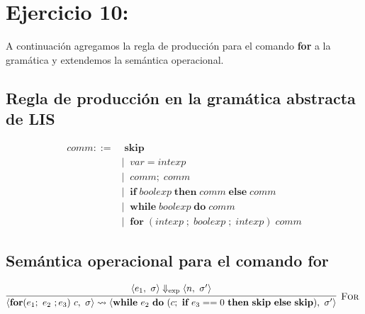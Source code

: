 \documentclass[11pt, fleqn]{article}
\begin{document}

\section*{Ejercicio 10:}

A continuación agregamos la regla de producción para el comando \textbf{for} a la
gramática y extendemos la semántica operacional.

\subsection*{Regla de producción en la gramática abstracta de LIS}

\begin{align*}
comm ::=& \; \textbf{skip} \\
        &| \;\; var = intexp \\
        &| \;\; comm; \; comm \\
        &| \;\; \textbf{if} \; boolexp \; \textbf{then} \; comm \; \textbf{else} \; comm \\
        &| \;\; \textbf{while} \; boolexp \; \textbf{do} \; comm \\
        &| \;\; \textbf{for} \; (intexp \; ; \; boolexp \; ; \; intexp) \; comm  
\end{align*}

\subsection*{Semántica operacional para el comando for}
\[
\infr[\rn{For}]
  {\sexp
    {\pair{e_1}{\sigma}}
    {\pair{n}{\sigma'}}
  }
  {\step
    {\pair{\cfor{e_1}{e_2}{e_3}{c}}{\sigma}}
    {\pair{\cwhile{e_2}{(\cseq{c}{{\cif{e_3 == 0}{\cskip}{\cskip}}})}}
          {\sigma'}}
  }
\
\]
\end{document}
